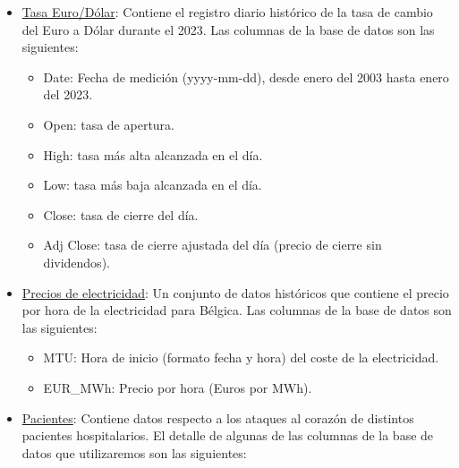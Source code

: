 \documentclass[
  11pt,
]{book}
\providecommand{\tightlist}{%
  \setlength{\itemsep}{0pt}\setlength{\parskip}{0pt}}
\theoremstyle{definition}
\theoremstyle{definition}
\theoremstyle{definition}
\theoremstyle{definition}
\theoremstyle{remark}
\begin{document}
\begin{itemize}
\item
  \label{TasaEURUSD}\href{https://raw.githubusercontent.com/Dfranzani/Bases-de-datos-para-cursos/main/2023-1/Tasa\%2Beuro\%2Bdolar\%2Bhistorica2023.csv}{Tasa Euro/Dólar}: Contiene el registro diario histórico de la tasa de cambio del Euro a Dólar durante el 2023. Las columnas de la base de datos son las siguientes:

  \begin{itemize}
  \tightlist
  \item
    Date: Fecha de medición (yyyy-mm-dd), desde enero del 2003 hasta enero del 2023.
  \item
    Open: tasa de apertura.
  \item
    High: tasa más alta alcanzada en el día.
  \item
    Low: tasa más baja alcanzada en el día.
  \item
    Close: tasa de cierre del día.
  \item
    Adj Close: tasa de cierre ajustada del día (precio de cierre sin dividendos).
  \end{itemize}
\item
  \label{PreciosElectricidad}\href{https://raw.githubusercontent.com/Dfranzani/Bases-de-datos-para-cursos/main/2024-1/Belgian\%20Electricity\%20Prices.csv}{Precios de electricidad}: Un conjunto de datos históricos que contiene el precio por hora de la electricidad para Bélgica. Las columnas de la base de datos son las siguientes:

  \begin{itemize}
  \tightlist
  \item
    MTU: Hora de inicio (formato fecha y hora) del coste de la electricidad.
  \item
    EUR\_MWh: Precio por hora (Euros por MWh).
  \end{itemize}
\item
  \label{Pacientes}\href{https://raw.githubusercontent.com/Dfranzani/Bases-de-datos-para-cursos/main/2023-1/Heart+complete.csv}{Pacientes}: Contiene datos respecto a los ataques al corazón de distintos pacientes hospitalarios. El detalle de algunas de las columnas de la base de datos que utilizaremos son las siguientes:


\end{itemize}
\end{document}
